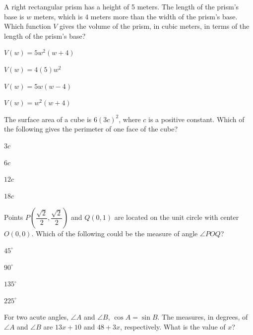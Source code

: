 \vfill
\clearpage
\noindent\begin{minipage}{\linewidth}
\par\smallskip
A right rectangular prism has a height of 5 meters. The length of the prism's base is $w$ meters, which is 4 meters more than the width of the prism's base. Which function $V$ gives the volume of the prism, in cubic meters, in terms of the length of the prism's base?
\begin{satchoices}
  \item[A)] $V(w)=5w^2(w+4)$
  \item[B)] $V(w)=4(5)w^2$
  \item[C)] $V(w)=5w(w-4)$
  \item[D)] $V(w)=w^2(w+4)$
\end{satchoices}
\end{minipage}
\vfill
\noindent\begin{minipage}{\linewidth}
\par\smallskip
The surface area of a cube is $6(3c)^2$, where $c$ is a positive constant. Which of the following gives the perimeter of one face of the cube?
\begin{satchoices}
  \item[A)] $3c$
  \item[B)] $6c$
  \item[C)] $12c$
  \item[D)] $18c$
\end{satchoices}
\end{minipage}
\vfill
\noindent\begin{minipage}{\linewidth}
\par\smallskip
Points $P\left(\dfrac{\sqrt{2}}{2},\dfrac{\sqrt{2}}{2}\right)$ and $Q(0,1)$ are located on the unit circle with center $O(0,0)$. Which of the following could be the measure of angle $\angle POQ$?
\begin{satchoices}
  \item[A)] $45^\circ$
  \item[B)] $90^\circ$
  \item[C)] $135^\circ$
  \item[D)] $225^\circ$
\end{satchoices}
\end{minipage}
\vfill
\clearpage
\noindent\begin{minipage}{\linewidth}
\par\smallskip
For two acute angles, $\angle A$ and $\angle B$, $\cos A=\sin B$. The measures, in degrees, of $\angle A$ and $\angle B$ are $13x+10$ and $48+3x$, respectively. What is the value of $x$?
\end{minipage}
